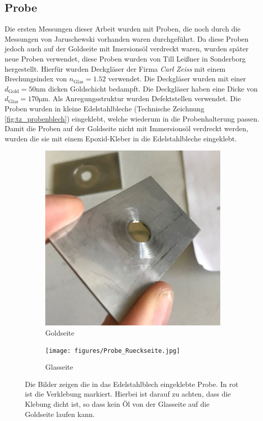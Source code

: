 \documentclass[titlepage]{article}
\begin{document}
\subsection{Probe}
	Die ersten Messungen dieser Arbeit wurden mit Proben, die noch durch die Messungen von Jaruschewski \cite{Jaruschewski.2020} vorhanden waren durchgeführt. Da diese Proben jedoch auch auf der Goldseite mit Imersionsöl verdreckt waren, wurden später neue Proben verwendet, diese Proben wurden von Till Leißner in Sonderborg hergestellt. Hierfür wurden Deckgläser der Firma \textit{Carl Zeiss} mit einem Brechungsindex von $n_{\mathrm{Glas}}= 1.52$ verwendet. Die Deckgläser wurden mit einer $d_{\mathrm{Gold}} = 50\mathrm{nm}$ dicken Goldschicht bedampft. Die Deckgläser haben eine Dicke von $d_{\mathrm{Glas}} = 170 \mathrm{\mu m}$. Als Anregungsstruktur wurden Defektstellen verwendet. Die Proben wurden in kleine Edelstahlbleche (Technische Zeichnung \ref{fig:tz_probenblech}) eingeklebt, welche wiederum in die Probenhalterung passen. Damit die Proben auf der Goldseite nicht mit Immersionsöl verdreckt werden, wurden die sie mit einem Epoxid-Kleber in die Edelstahlbleche eingeklebt.
	\begin{figure}
		\centering
		\begin{subfigure}[b]{0.4\textwidth}
			\centering
			\includegraphics[width=\textwidth]{figures/Probe_Vorderseite.jpg}
			\caption{Goldseite}
			\label{fig:probe_vorderseite}
		\end{subfigure}
		\hfill
		\begin{subfigure}[b]{0.4\textwidth}
			\centering
			\texttt{[image: figures/Probe\_Rueckseite.jpg]}
			\caption{Glasseite}
			\label{fig:probe_rueckseite}
		\end{subfigure}
		\caption{Die Bilder zeigen die in das Edelstahlblech eingeklebte Probe. In rot ist die Verklebung markiert. Hierbei ist darauf zu achten, dass die Klebung dicht ist, so dass kein Öl von der Glasseite auf die Goldseite laufen kann.}
		\label{fig:probe}
	\end{figure}
\end{document}
